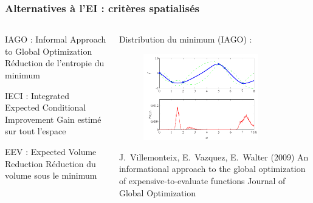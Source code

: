 \begin{frame}
\frametitle{Alternatives à l'EI : critères spatialisés}

\begin{columns}[t]
\begin{column}{6cm}
\begin{block}{IAGO : Informal Approach to Global Optimization}
Réduction de l'entropie du minimum
\end{block}

\begin{block}{IECI : Integrated Expected Conditional Improvement}
Gain estimé sur tout l'espace
\end{block}

\begin{block}{EEV : Expected Volume Reduction}
Réduction du volume sous le minimum
\end{block}

\end{column}

\begin{column}{6cm}
Distribution du minimum (IAGO) :
\begin{figure}
	\centering
		\includegraphics[width=50mm]{fig/iago.png}
\end{figure}

\scriptsize{
 \begin{thebibliography}{1}
\beamertemplatearticlebibitems
     J.~Villemonteix, E.~Vazquez, E.~Walter (2009)
         \newblock An informational approach to the global optimization of expensive-to-evaluate functions
         \newblock Journal of Global Optimization       
 \end{thebibliography}
}
\end{column}
\end{columns}
\end{frame}
